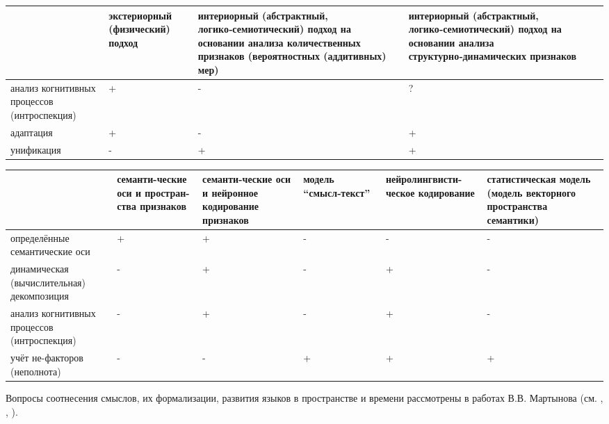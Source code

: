 \begin{SCn}
\end{SCn}

\begin{tabular}{|>{\centering\arraybackslash}m{3cm}|>{\centering\arraybackslash}m{3cm}|>{\centering\arraybackslash}m{5cm}|>{\centering\arraybackslash}m{5.25cm}|}
	\hline
	& экстериорный (физический) подход
	& интериорный (абстрактный, логико‑семиотический) подход на основании анализа количественных признаков (вероятностных (аддитивных) мер)
	& интериорный (абстрактный, логико‑семиотический) подход на основании анализа структурно‑динамических признаков
	\\
	\hline
	анализ когнитивных процессов (интроспекция)
	& +
	& -
	& ?
	\\
	\hline
	адаптация
	& +
	& -
	& +
	\\
	\hline
	унификация
	& -
	& +
	& +
	\\
	\hline
\end{tabular}

\begin{tabular}{|>{\centering\arraybackslash}m{3cm}|>{\centering\arraybackslash}m{2cm}|>{\centering\arraybackslash}m{2cm}|>{\centering\arraybackslash}m{3cm}|>{\centering\arraybackslash}m{3cm}|>{\centering\arraybackslash}m{3cm}|}
	\hline
	& семанти-ческие оси и простран-ства признаков
	& семанти-ческие оси и нейронное кодирование признаков
	& модель ``смысл‑текст''
	& нейролингвисти-ческое кодирование
	& статистическая модель (модель векторного пространства семантики)
	\\
	\hline
	определённые семантические оси
	& +
	& +
	& -
	& -
	& -
	\\
	\hline
	динамическая (вычислительная) декомпозиция
	& -
	& +
	& -
	& +
	& -
	\\
	\hline
	анализ когнитивных процессов (интроспекция)
	& -
	& +
	& -
	& +
	& -
	\\
	\hline
	учёт не-факторов (неполнота)
	& -
	& -
	& +
	& +
	& +
	\\
	\hline
\end{tabular}


Вопросы соотнесения смыслов, их формализации, развития языков в пространстве и времени рассмотрены в работах В.В. Мартынова (см. , , ).


